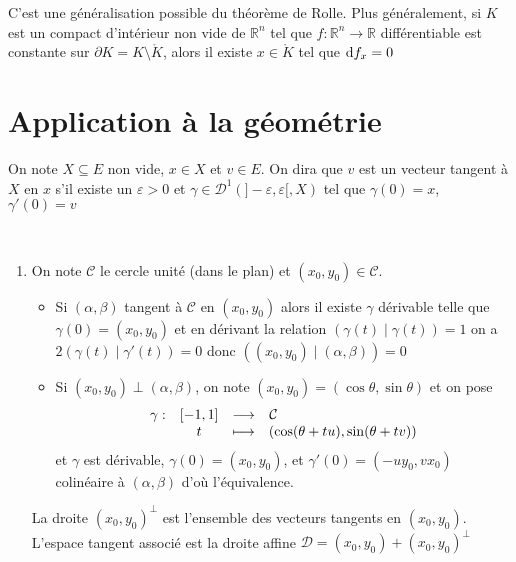 \begin{rem}
    C'est une généralisation possible du théorème de Rolle. Plus généralement, si $K$ est un compact d'intérieur non vide de $\mathbb R^n$ tel que $f:\mathbb R^n\to\mathbb R$ différentiable est constante sur $\partial K=K\setminus \mathring K$, alors il existe $x\in\mathring K$ tel que $\mathrm{d} f_x=0$
\end{rem}

\section{Application à la géométrie}

\begin{dfn}
    On note $X\subseteq E$ non vide, $x\in X$ et $v\in E$. On dira que $v$ est un vecteur tangent à $X$ en $x$ s'il existe un $\varepsilon>0$ et $\gamma\in\mathcal D^1(]-\varepsilon, \varepsilon[, X)$ tel que $\gamma (0)=x$, $\gamma'(0)=v$
\end{dfn}

\begin{ex}~
    \begin{enumerate}
        \item On note $\mathcal C$ le cercle unité (dans le plan) et $(x_0, y_0)\in\mathcal C$. \begin{itemize}
            \item Si $(\alpha, \beta)$ tangent à $\mathcal C$ en $(x_0, y_0)$ alors il existe $\gamma$ dérivable telle que $\gamma(0)=(x_0, y_0)$ et en dérivant la relation $(\gamma(t)\;|\;\gamma(t))=1$ on a $2(\gamma(t)\;|\;\gamma'(t))=0$ donc $((x_0, y_0)\;|\;(\alpha, \beta))=0$
            \item Si $(x_0, y_0)\perp (\alpha, \beta)$, on note $(x_0, y_0)=(\cos\theta, \sin\theta)$ et on pose \[
                \begin{matrix}
                    \gamma : & [-1, 1] & \longrightarrow & \mathcal C\hspace{3.5cm} \\
                              & t & \longmapsto & (\cos(\theta+tu), \sin(\theta+tv))
                \end{matrix}
                \]
                et $\gamma$ est dérivable, $\gamma(0)=(x_0, y_0)$, et $\gamma'(0)=(-uy_0, vx_0)$ colinéaire à $(\alpha, \beta)$ d'où l'équivalence.
        \end{itemize}
        La droite $(x_0, y_0)^{\perp}$ est l'ensemble des vecteurs tangents en $(x_0, y_0)$. L'espace tangent associé est la droite affine $\mathcal D=(x_0, y_0)+(x_0, y_0)^{\perp}$
    \end{enumerate}
\end{ex}
